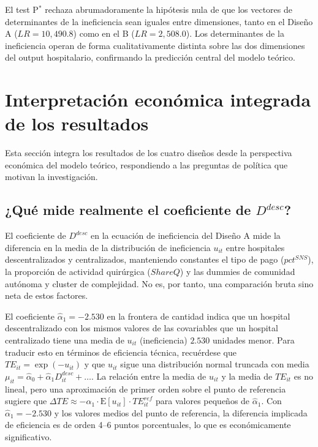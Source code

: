 \documentclass[12pt, a4paper, twoside, openright]{book}
\theoremstyle{plain}
\theoremstyle{definition}
\theoremstyle{remark}
\begin{document}
El test P$^*$ rechaza abrumadoramente la hipótesis nula de que los vectores de determinantes de la ineficiencia sean iguales entre dimensiones, tanto en el Diseño A ($LR=10{,}490.8$) como en el B ($LR=2{,}508.0$). Los determinantes de la ineficiencia operan de forma cualitativamente distinta sobre las dos dimensiones del output hospitalario, confirmando la predicción central del modelo teórico.

\section{Interpretación económica integrada de los resultados}
\label{sec:interpretacion_economica_integ}

Esta sección integra los resultados de los cuatro diseños desde la perspectiva económica del modelo teórico, respondiendo a las preguntas de política que motivan la investigación.

\subsection{¿Qué mide realmente el coeficiente de \texorpdfstring{$D^{desc}$}{D\^{}desc}?}

El coeficiente de $D^{desc}$ en la ecuación de ineficiencia del Diseño A mide la diferencia en la media de la distribución de ineficiencia $u_{it}$ entre hospitales descentralizados y centralizados, manteniendo constantes el tipo de pago ($pct^{SNS}$), la proporción de actividad quirúrgica ($ShareQ$) y las dummies de comunidad autónoma y cluster de complejidad. No es, por tanto, una comparación bruta sino neta de estos factores.

El coeficiente $\hat{\alpha}_1 = -2.530$ en la frontera de cantidad indica que un hospital descentralizado con los mismos valores de las covariables que un hospital centralizado tiene una media de $u_{it}$ (ineficiencia) $2.530$ unidades menor. Para traducir esto en términos de eficiencia técnica, recuérdese que $TE_{it} = \exp(-u_{it})$ y que $u_{it}$ sigue una distribución normal truncada con media $\mu_{it} = \hat{\alpha}_0 + \hat{\alpha}_1 D^{desc}_{it} + \ldots$. La relación entre la media de $u_{it}$ y la media de $TE_{it}$ es no lineal, pero una aproximación de primer orden sobre el punto de referencia sugiere que $\Delta TE \approx -\hat{\alpha}_1 \cdot \text{E}[u_{it}] \cdot TE_{it}^{ref}$ para valores pequeños de $\hat{\alpha}_1$. Con $\hat{\alpha}_1 = -2.530$ y los valores medios del punto de referencia, la diferencia implicada de eficiencia es de orden 4--6 puntos porcentuales, lo que es económicamente significativo.
\end{document}
